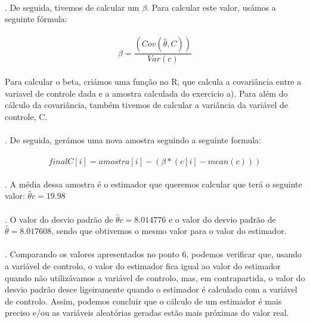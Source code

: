 \documentclass{article}
\begin{document}
				\paragraph{}
					. De seguida, tivemos de calcular um  $\beta$. Para calcular este valor, usámos a seguinte fórmula:
				\paragraph{}
					\begin{equation*}
						\beta=\frac{(Cov(\hat{\theta},C))}{Var(c)}
					\end{equation*}
				\paragraph{}
						Para calcular o beta, criámos uma função no R, que calcula a covariância entre a variavel de controle dada e a amostra calculada do exercicio a). Para além do cálculo da covariância, também tivemos de calcular a variância da variável de controle, C.
				\paragraph{}
					. De seguida, gerámos uma nova amostra seguindo a seguinte formula:
				\paragraph{}
					\begin{equation*}
						finalC[i] = amostra[i] - (\beta*(c[i] - mean(c)))
					\end{equation*}
				\paragraph{}
				\paragraph{}
					. A média dessa amostra é o estimador que queremos calcular que terá o seguinte valor:  $\hat{\theta}c = 19.98$ 
				\paragraph{}
					. O valor do desvio padrão de  $\hat{\theta}c = 8.014776$ e o valor do desvio padrão de $\hat{\theta} = 8.017608$, sendo que obtivemos o mesmo valor para o valor do estimador.
				\paragraph{}
					. Comparando os valores apresentados no ponto 6, podemos verificar que, usando a variável de controlo, o valor do estimador fica igual ao valor do estimador quando não utilizávamos a variável de controlo, mas, em contrapartida, o valor do desvio padrão desce ligeiramente quando o estimador é calculado com a variável de controlo. Assim, podemos concluir que o cálculo de um estimador é mais preciso e/ou as variáveis aleatórias geradas estão mais próximas do valor real.
\end{document}

